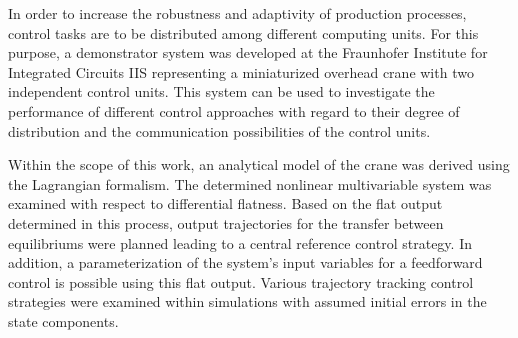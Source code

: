 \documentclass[arbeit=studie,oneside,BCOR=12mm]{ArbeitRST}
\begin{document}
{In order to increase the robustness and adaptivity of production processes, control tasks are to be distributed among different computing units. For this purpose, a demonstrator system was developed at the Fraunhofer Institute for Integrated Circuits IIS representing a miniaturized overhead crane with two independent control units. This system can be used to investigate the performance of different control approaches with regard to their degree of distribution and the communication possibilities of the control units. 
	
Within the scope of this work, an analytical model of the crane was derived using the Lagrangian formalism. The determined nonlinear multivariable system was examined with respect to differential flatness. Based on the flat output determined in this process, output trajectories for the transfer between equilibriums were planned leading to a central reference control strategy. In addition, a parameterization of the system's input variables for a feedforward control is possible using this flat output. Various trajectory tracking control strategies were examined within simulations with assumed initial errors in the state components.}
\tableofcontents


\end{document}
